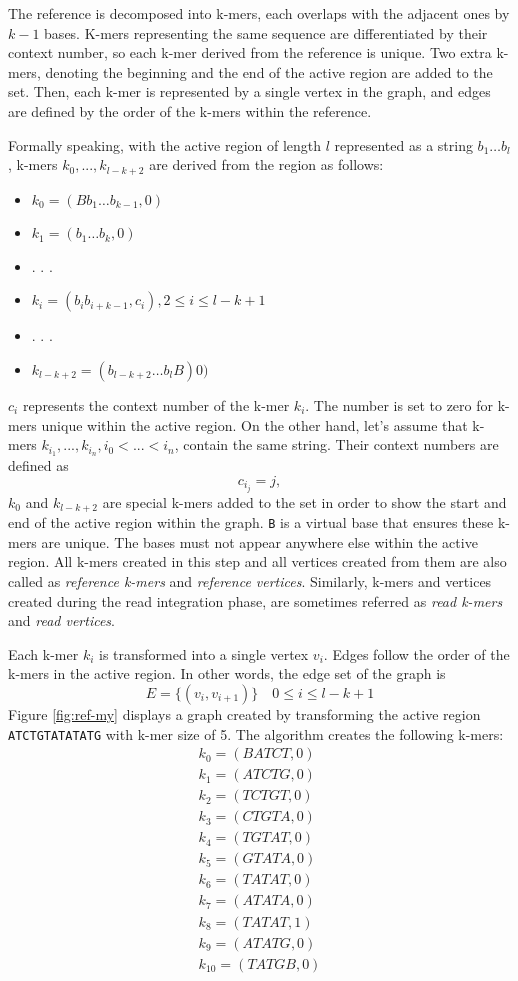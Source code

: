 The reference is decomposed into k-mers, each overlaps with the adjacent ones by $k-1$ bases. K-mers representing the same sequence are differentiated by their context number, so each k-mer derived from the reference is unique. Two extra k-mers, denoting the beginning and the end of the active region are added to the set. Then, each k-mer is represented by a single vertex in the graph, and edges are defined by the order of the k-mers within the reference.

Formally speaking, with the active region of length $l$ represented as a string $b_1 \ldots b_{l}$, k-mers $k_0, ..., k_{l-k+2}$ are derived from the region as follows:
\begin{itemize}
\item $k_0 = (Bb_1 \ldots b_{k-1}, 0)$
\item $k_1 = (b_1 \ldots b_k, 0)$
\item . . .
\item $k_i = (b_i b_{i+k-1}, c_i), 2 \leq i \leq  l-k+1$
\item . . .
\item $k_{l-k+2} = (b_{l-k+2} \ldots b_lB) 0)$
\end{itemize}
$c_i$ represents the context number of the k-mer $k_i$. The number is set to zero for k-mers unique within the active region. On the other hand, let's assume that k-mers $k_{i_1}, ..., k_{i_n}, i_0 < ... < i_n$, contain the same string. Their context numbers are defined as
$$
c_{i_j} = j, 
$$
$k_0$ and $k_{l-k+2}$ are special k-mers added to the set in order to show the start and end of the active region within the graph. \texttt{B} is a virtual base that ensures these k-mers are unique. The bases must not appear anywhere else within the active region. All k-mers created in this step and all vertices created from them are also called as \textit{reference k-mers} and \textit{reference vertices}. Similarly, k-mers and vertices created during the read integration phase, are sometimes referred as \textit{read k-mers} and \textit{read vertices}.

Each k-mer $k_i$ is transformed into a single vertex $v_i$. Edges follow the order of the k-mers in the active region. In other words, the edge set of the graph is
$$
E = \{(v_i, v_{i+1})\}\quad 0 \leq i \leq l-k+1
$$
Figure \ref{fig:ref-my} displays a graph created by transforming the active region \texttt{ATCTGTATATATG} with k-mer size of 5. The algorithm creates the following k-mers:
\begin{align*}
k_0 = (BATCT, 0) \\
k_1 = (ATCTG, 0) \\
k_2 = (TCTGT, 0) \\
k_3 = (CTGTA, 0) \\
k_4 = (TGTAT, 0) \\
k_5 = (GTATA, 0) \\
k_6 = (TATAT, 0) \\
k_7 = (ATATA, 0) \\
k_8 = (TATAT, 1) \\
k_9 = (ATATG, 0) \\
k_{10} = (TATGB, 0)
\end{align*}

